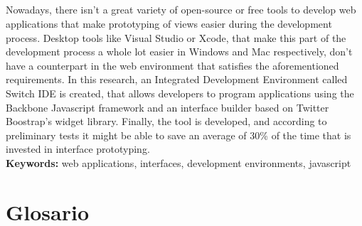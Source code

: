 \documentclass[12pt,spanish,letter]{report}
\makeatletter
\renewenvironment{abstract}{%
  \if@twocolumn
    \section*{\abstractname}%
  \else
    \small
    \begin{center}%
      {\bfseries \abstractname \vspace{-.5em}\vspace{\z@}}%
    \end{center}%
    \quotation
  \fi}
  {\if@twocolumn\else\endquotation\fi}
\makeatother
\begin{document}
\begin{abstract}

Nowadays, there isn't a great variety of open-source or free tools to develop web applications that make prototyping of views easier during the development process. Desktop tools like Visual Studio or Xcode, that make this part of the development process a whole lot easier in Windows and Mac respectively, don't have a counterpart in the web environment that satisfies the aforementioned requirements. In this research, an Integrated Development Environment called Switch IDE is created, that allows developers to program applications using the Backbone Javascript framework and an interface builder based on Twitter Boostrap's widget library. Finally, the tool is developed, and according to preliminary tests it might be able to save an average of 30\% of the time that is invested in interface prototyping.
\\[\baselineskip]
\textbf{Keywords:} web applications, interfaces, development environments, javascript

\end{abstract}
\vspace*{\fill}


\chapter*{Glosario}
\end{document}
